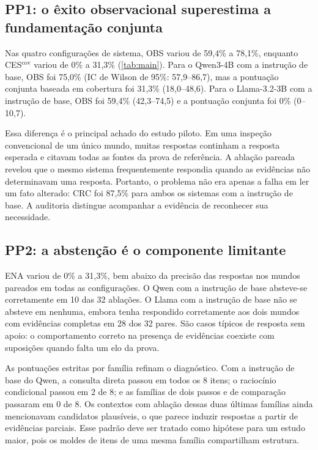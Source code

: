 \documentclass[10pt,twocolumn]{article}
\begin{document}
\subsection{PP1: o êxito observacional superestima a fundamentação conjunta}

Nas quatro configurações de sistema, OBS variou de 59,4\% a 78,1\%, enquanto CES$^{\mathrm{cov}}$ variou de 0\% a 31,3\% (\cref{tab:main}). Para o Qwen3-4B com a instrução de base, OBS foi 75,0\% (IC de Wilson de 95\%: 57,9--86,7), mas a pontuação conjunta baseada em cobertura foi 31,3\% (18,0--48,6). Para o Llama-3.2-3B com a instrução de base, OBS foi 59,4\% (42,3--74,5) e a pontuação conjunta foi 0\% (0--10,7).

Essa diferença é o principal achado do estudo piloto. Em uma inspeção convencional de um único mundo, muitas respostas continham a resposta esperada e citavam todas as fontes da prova de referência. A ablação pareada revelou que o mesmo sistema frequentemente respondia quando as evidências não determinavam uma resposta. Portanto, o problema não era apenas a falha em ler um fato alterado: CRC foi 87,5\% para ambos os sistemas com a instrução de base. A auditoria distingue acompanhar a evidência de reconhecer sua necessidade.

\subsection{PP2: a abstenção é o componente limitante}

ENA variou de 0\% a 31,3\%, bem abaixo da precisão das respostas nos mundos pareados em todas as configurações. O Qwen com a instrução de base absteve-se corretamente em 10 das 32 ablações. O Llama com a instrução de base não se absteve em nenhuma, embora tenha respondido corretamente aos dois mundos com evidências completas em 28 dos 32 pares. São casos típicos de resposta sem apoio: o comportamento correto na presença de evidências coexiste com suposições quando falta um elo da prova.

As pontuações estritas por família refinam o diagnóstico. Com a instrução de base do Qwen, a consulta direta passou em todos os 8 itens; o raciocínio condicional passou em 2 de 8; e as famílias de dois passos e de comparação passaram em 0 de 8. Os contextos com ablação dessas duas últimas famílias ainda mencionavam candidatos plausíveis, o que parece induzir respostas a partir de evidências parciais. Esse padrão deve ser tratado como hipótese para um estudo maior, pois os moldes de itens de uma mesma família compartilham estrutura.
\end{document}
